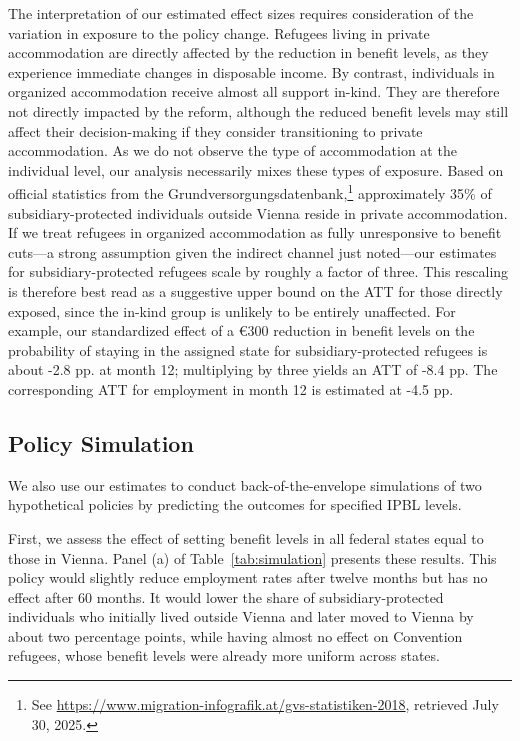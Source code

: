 The interpretation of our estimated effect sizes requires consideration of the variation in exposure to the policy change. Refugees living in private accommodation are directly affected by the reduction in benefit levels, as they experience immediate changes in disposable income. By contrast, individuals in organized accommodation receive almost all support in-kind. They are therefore not directly impacted by the reform, although the reduced benefit levels may still affect their decision-making if they consider transitioning to private accommodation. As we do not observe the type of accommodation at the individual level, our analysis necessarily mixes these types of exposure. Based on official statistics from the Grundversorgungsdatenbank,\footnote{See \url{https://www.migration-infografik.at/gvs-statistiken-2018}, retrieved July 30, 2025.} approximately 35\% of subsidiary-protected individuals outside Vienna reside in private accommodation. If we treat refugees in organized accommodation as fully unresponsive to benefit cuts---a strong assumption given the indirect channel just noted---our estimates for subsidiary-protected refugees scale by roughly a factor of three. This rescaling is therefore best read as a suggestive upper bound on the ATT for those directly exposed, since the in-kind group is unlikely to be entirely unaffected. For example, our standardized effect of a €300 reduction in benefit levels on the probability of staying in the assigned state for subsidiary-protected refugees is about -2.8 pp. at month 12; multiplying by three yields an ATT of -8.4 pp. The corresponding ATT for employment in month 12 is estimated at -4.5 pp. 

\subsection*{Policy Simulation}
\FloatBarrier

We also use our estimates to conduct back-of-the-envelope simulations of two hypothetical policies by predicting the outcomes for specified IPBL levels.

First, we assess the effect of setting benefit levels in all federal states equal to those in Vienna. Panel (a) of Table~\ref{tab:simulation} presents these results. This policy would slightly reduce employment rates after twelve months but has no effect after 60 months. It would lower the share of subsidiary-protected individuals who initially lived outside Vienna and later moved to Vienna by about two percentage points, while having almost no effect on Convention refugees, whose benefit levels were already more uniform across states.

